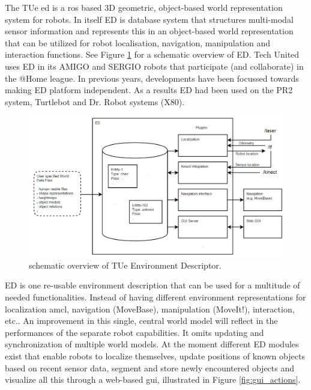 The TUe \acrfull{ed} is a \acrfull{ros} based 3D geometric, object-based world representation system for robots. In itself ED is database system that structures multi-modal sensor information and represents this in an object-based world representation that can be utilized for robot localisation, navigation, manipulation and interaction functions. See Figure \ref{fig:ed} for a schematic overview of ED. %
Tech United uses ED in its AMIGO and SERGIO robots that participate (and collaborate) in the @Home league. In previous years, developments have been focussed towards making ED platform independent. As a results ED had been used on the PR2 system, Turtlebot and Dr. Robot systems (X80).
\begin{figure}[h]
	\includegraphics[width = 0.9\linewidth]{Figures/ed_overview}
	\caption{schematic overview of TUe Environment Descriptor.}
	\label{fig:ed}
\end{figure}
ED is one re-usable environment description that can be used for a multitude of needed functionalities. Instead of having different environment representations for localization \acrfull{amcl}, navigation (MoveBase), manipulation (MoveIt!), interaction, etc.. An improvement in this single, central world model will reflect in the performances of the separate robot capabilities. It omits updating and synchronization of multiple world models. At the moment different ED modules exist that enable robots to localize themselves, update positions of known objects based on recent sensor data, segment and store newly encountered objects and visualize all this through a web-based \acrshort{gui}, illustrated in Figure \ref{fig:gui_actions}.
